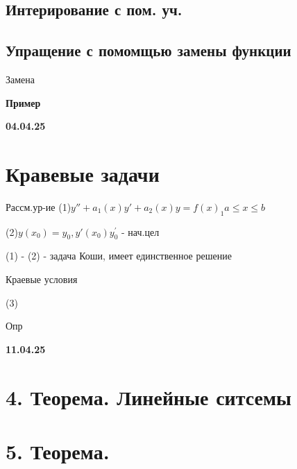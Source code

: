 \documentclass{article}
\begin{document}
\subsection{Интерирование с пом. уч.}

\subsection{Упращение с помомщью замены функции}

Замена




\textbf{Пример}






\textbf{04.04.25}

\section{Кравевые задачи}

Рассм.ур-ие
(1)$y''+a_1(x)y'+a_2(x)y = f(x)_1a\leq x \leq b$

(2)$y(x_0)=y_0, y'(x_0)y_{0}^{'}$ - нач.цел

(1) - (2) - задача Коши, имеет единственное решение

Краевые условия 

(3)


Опр



\vspace{1cm}

\textbf{11.04.25}




\section{4. Теорема. Линейные ситсемы}













\section{5. Теорема. }
\end{document}
